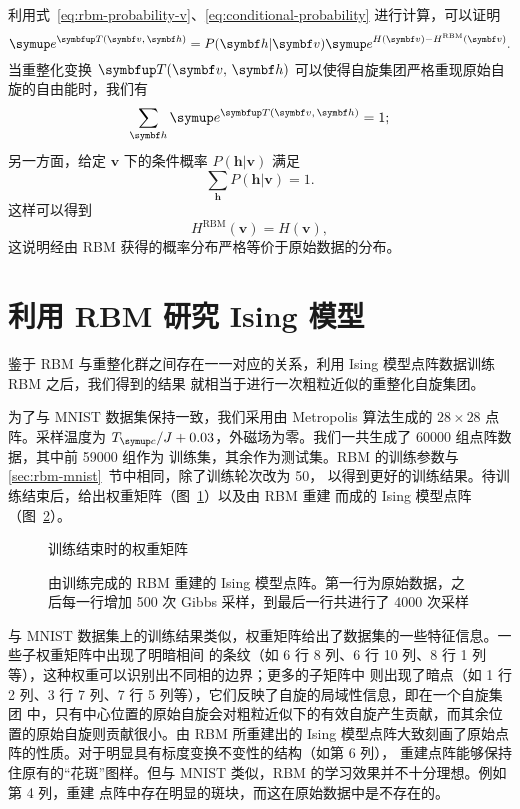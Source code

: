 利用式~\eqref{eq:rbm-probability-v}、\eqref{eq:conditional-probability} 进行计算，可以证明
\cite{exact}
\begin{equation}
  \ee^{\opT(\bm{v},\,\bm{h})} = P(\bm{h}|\bm{v}) \ee^{H(\bm{v})-H^{\text{RBM}}(\bm{v})}.
\end{equation}
当重整化变换 $\opT(\bm{v},\,\bm{h})$ 可以使得自旋集团严格重现原始自旋的自由能时，我们有
\begin{equation}
  \sum_{\bm{h}} \ee^{\opT(\bm{v},\,\bm{h})} = 1;
\end{equation}
另一方面，给定 $\bm{v}$ 下的条件概率 $P(\bm{h}|\bm{v})$ 满足
\begin{equation}
  \sum_{\bm{h}} P(\bm{h}|\bm{v}) = 1.
\end{equation}
这样可以得到
\begin{equation}
  H^{\text{RBM}}(\bm{v}) = H(\bm{v}),
\end{equation}
这说明经由 RBM 获得的概率分布严格等价于原始数据的分布。

\section{利用 RBM 研究 Ising 模型}

鉴于 RBM 与重整化群之间存在一一对应的关系，利用 Ising 模型点阵数据训练 RBM 之后，我们得到的结果
就相当于进行一次粗粒近似的重整化自旋集团。

为了与 MNIST 数据集保持一致，我们采用由 Metropolis 算法生成的 $28 \times 28$ 点阵。采样温度为
$\Tc/J+\num{0.03}$，外磁场为零。我们一共生成了 \num{60000} 组点阵数据，其中前 \num{59000} 组作为
训练集，其余作为测试集。RBM 的训练参数与 \ref{sec:rbm-mnist}~节中相同，除了训练轮次改为 50，
以得到更好的训练结果。待训练结束后，给出权重矩阵（图~\ref{fig:ising-weight}）以及由 RBM 重建
而成的 Ising 模型点阵（图~\ref{fig:ising-samples}）。

\begin{figure}[htb]
  \centering
  \caption{训练结束时的权重矩阵}
  \label{fig:ising-weight}
\end{figure}

\begin{figure}[htb]
  \centering
  \caption{由训练完成的 RBM 重建的 Ising 模型点阵。第一行为原始数据，之后每一行增加 \num{500}
    次 Gibbs 采样，到最后一行共进行了 \num{4000} 次采样}
  \label{fig:ising-samples}
\end{figure}

与 MNIST 数据集上的训练结果类似，权重矩阵给出了数据集的一些特征信息。一些子权重矩阵中出现了明暗相间
的条纹（如 6 行 8 列、6 行 10 列、8 行 1 列等），这种权重可以识别出不同相的边界；更多的子矩阵中
则出现了暗点（如 1 行 2 列、3 行 7 列、7 行 5 列等），它们反映了自旋的局域性信息，即在一个自旋集团
中，只有中心位置的原始自旋会对粗粒近似下的有效自旋产生贡献，而其余位置的原始自旋则贡献很小。由 RBM
所重建出的 Ising 模型点阵大致刻画了原始点阵的性质。对于明显具有标度变换不变性的结构（如第 6 列），
重建点阵能够保持住原有的“花斑”图样。但与 MNIST 类似，RBM 的学习效果并不十分理想。例如第 4 列，重建
点阵中存在明显的斑块，而这在原始数据中是不存在的。

